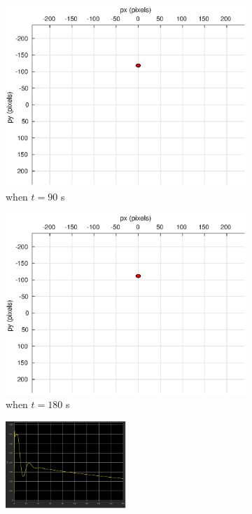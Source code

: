 \begin{figure}[htbp]
\begin{subfigure}[t]{0.32\linewidth}
		\includegraphics[width=\textwidth]{images/chapter4/image_camera_5mps_90s}
		\caption{when $t=90$ s}
	\end{subfigure}
	\begin{subfigure}[t]{0.32\linewidth}
		\includegraphics[width=\textwidth]{images/chapter4/image_camera_5mps_180s}
		\caption{when $t=180$ s}
	\end{subfigure}	
	\begin{subfigure}[t]{0.8\linewidth}
		\centering
		\includegraphics[width=0.5\textwidth]{images/chapter4/image_Ex_5mps}

\end{subfigure}
\end{figure}
